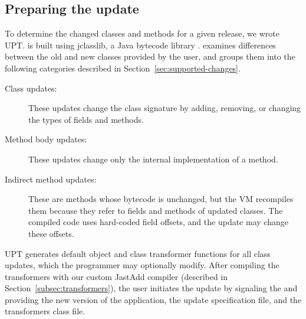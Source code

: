 \subsection{Preparing the update}
\label{sec:prep}

To determine the changed classes and methods for a given release, we wrote
\acf{UPT}. \UPT is built using jclasslib, a Java bytecode library
\cite{jclasslib}. \UPT examines differences between the old and new classes
provided by the user, and groups them into the following categories
described in Section~\ref{sec:supported-changes}.

\begin{description}
\item[Class updates:] These updates change the class signature by
  adding, removing, or changing the types of fields and methods.
\item[Method body updates:] These updates change only the internal
implementation of a method. 
\item[Indirect method updates:] These are methods whose bytecode is
unchanged, but the VM recompiles them because they refer to fields and
methods of updated classes.   The compiled code uses hard-coded field
offsets, and the update may change these offsets.
\end{description}

\ac{UPT} generates default object and class transformer functions for all
class updates, which the programmer may optionally modify. After compiling
the transformers with our custom JastAdd compiler (described in
Section~\ref{subsec:transformers}), the user initiates the update by
signaling the \JV \VM and providing the new version of the application,
the update specification file, and the transformers class file.
